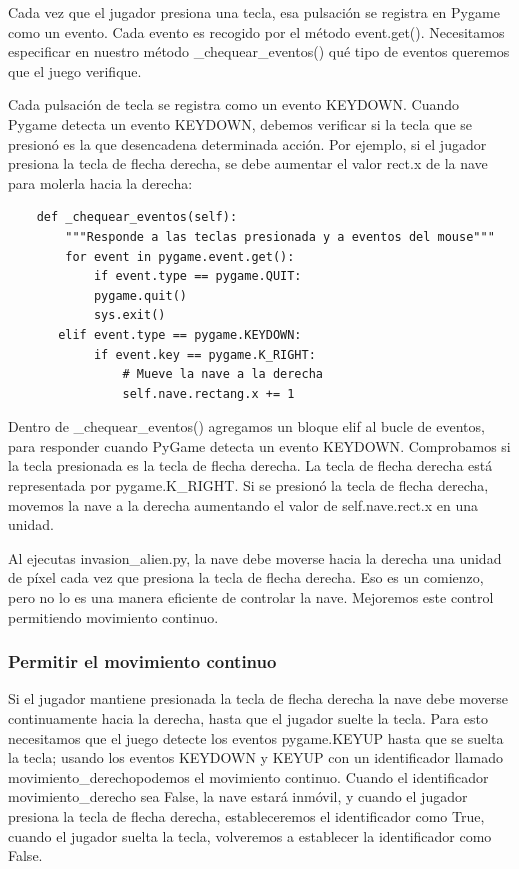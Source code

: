 Cada vez que el jugador presiona una tecla, esa pulsación se registra en Pygame como un evento. 
Cada evento es recogido por el método {\ttfamily event.get()}. Necesitamos especificar en nuestro método {\ttfamily \_chequear\_eventos()} qué tipo de eventos queremos que el juego verifique.

Cada pulsación de tecla se registra como un evento {\ttfamily KEYDOWN}. Cuando Pygame detecta un evento {\ttfamily KEYDOWN}, debemos verificar si la tecla que se presionó es la que desencadena determinada acción. Por ejemplo, si el jugador presiona la tecla de flecha derecha, se debe  aumentar el valor {\ttfamily rect.x} de la nave para molerla hacia la derecha:


\hspace{-2.5cm}{\ttfamily \scriptsize curso.py}  \vspace{-0.5cm}
\begin{lstlisting}		
    def _chequear_eventos(self):
        """Responde a las teclas presionada y a eventos del mouse"""
        for event in pygame.event.get():
            if event.type == pygame.QUIT:
            pygame.quit()
            sys.exit()	
       elif event.type == pygame.KEYDOWN:
            if event.key == pygame.K_RIGHT:
                # Mueve la nave a la derecha
                self.nave.rectang.x += 1
\end{lstlisting}	



Dentro de {\ttfamily \_chequear\_eventos()} agregamos un bloque {\ttfamily elif} al bucle de eventos, para responder
cuando PyGame detecta un evento {\ttfamily KEYDOWN}. Comprobamos si la tecla presionada es la tecla de flecha derecha. La tecla de flecha derecha está representada por {\ttfamily pygame.K\_RIGHT}. Si se presionó la tecla de flecha derecha, movemos la nave a la
derecha  aumentando el valor de {\ttfamily self.nave.rect.x} en una unidad.

Al ejecutas {\ttfamily invasion\_alien.py}, la nave debe moverse hacia la derecha una unidad de píxel cada vez que presiona la tecla de flecha derecha. Eso es un comienzo, pero no lo es una manera eficiente de controlar la nave. Mejoremos este control permitiendo
movimiento continuo.


\subsubsection{Permitir el movimiento continuo}

Si el jugador mantiene presionada la tecla de flecha derecha la nave debe moverse continuamente hacia la derecha, hasta que el jugador suelte la tecla. Para esto necesitamos que el juego detecte los eventos {\ttfamily pygame.KEYUP} hasta que se suelta la tecla; usando los eventos {\ttfamily KEYDOWN} y {\ttfamily KEYUP} con un identificador llamado {\ttfamily  movimiento\_derecho}podemos el movimiento continuo.
Cuando el identificador {\ttfamily  movimiento\_derecho} sea {\ttfamily False}, la nave estará inmóvil, y cuando el jugador presiona la tecla de flecha derecha, estableceremos el identificador como {\ttfamily True}, cuando el jugador suelta la tecla, volveremos a establecer la identificador como {\ttfamily False}.



